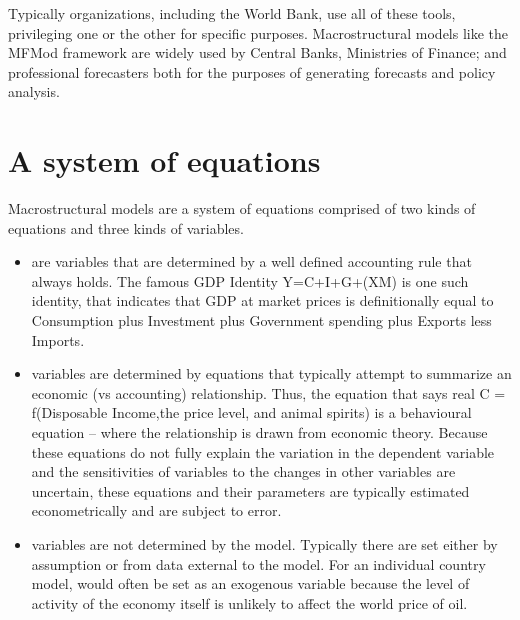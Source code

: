 \documentclass[letterpaper,10pt,english]{jupyterBook}
\begin{document}
\sphinxAtStartPar
Typically organizations, including the World Bank, use all of these tools, privileging one or the other for specific purposes. Macrostructural models like the MFMod framework are widely used by Central Banks, Ministries of Finance; and professional forecasters both for the purposes of generating forecasts and policy analysis.


\section{A system of equations}
\label{\detokenize{content/02_MacrostructuralModels/MacroStructuralModels:a-system-of-equations}}
\sphinxAtStartPar
Macro\sphinxhyphen{}structural models are a system of equations comprised of two kinds of equations and three kinds of variables.
\begin{itemize}
\item {} 
\sphinxAtStartPar
{} are variables that are determined by a well defined accounting rule that always holds. The famous GDP Identity Y=C+I+G+(X\sphinxhyphen{}M) is one such identity, that indicates that GDP at market prices is definitionally equal to Consumption plus Investment plus Government spending plus Exports less Imports.

\item {} 
\sphinxAtStartPar
{} variables are determined by equations that typically attempt to summarize an economic (vs accounting) relationship. Thus, the equation that says real C = f(Disposable Income,the price level, and animal spirits) is a behavioural equation – where the relationship is drawn from economic theory. Because these equations do not fully explain the variation in the dependent variable and the sensitivities of variables to the changes in other variables are uncertain, these equations and their parameters are  typically estimated econometrically and are subject to error.

\item {} 
\sphinxAtStartPar
{} variables are not determined by the model. Typically there are set either by assumption or from data external to the model.  For an individual country model, would often be set as an exogenous variable because the level of activity of the economy itself is unlikely to affect the world price of oil.

\end{itemize}
\end{document}
